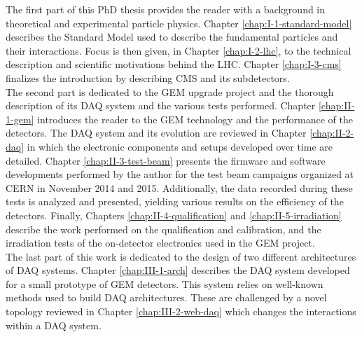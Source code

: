   The first part of this PhD thesis provides the reader with a background in theoretical and experimental particle physics. Chapter \ref{chap:I-1-standard-model} describes the Standard Model used to describe the fundamental particles and their interactions. Focus is then given, in Chapter \ref{chap:I-2-lhc}, to the technical description and scientific motivations behind the LHC. Chapter \ref{chap:I-3-cms} finalizes the introduction by describing CMS and its subdetectors. \\

  The second part is dedicated to the GEM upgrade project and the thorough description of its DAQ system and the various tests performed. Chapter \ref{chap:II-1-gem} introduces the reader to the GEM technology and the performance of the detectors. The DAQ system and its evolution are reviewed in Chapter \ref{chap:II-2-daq} in which the electronic components and setups developed over time are detailed. Chapter \ref{chap:II-3-test-beam} presents the firmware and software developments performed by the author for the test beam campaigns organized at CERN in November 2014 and 2015. Additionally, the data recorded during these tests is analyzed and presented, yielding various results on the efficiency of the detectors. Finally, Chapters \ref{chap:II-4-qualification} and \ref{chap:II-5-irradiation} describe the work performed on the qualification and calibration, and the irradiation tests of the on-detector electronics used in the GEM project. \\

  The last part of this work is dedicated to the design of two different architectures of DAQ systems. Chapter \ref{chap:III-1-arch} describes the DAQ system developed for a small prototype of GEM detectors. This system relies on well-known methods used to build DAQ architectures. These are challenged by a novel topology reviewed in Chapter \ref{chap:III-2-web-daq} which changes the interactions within a DAQ system.
